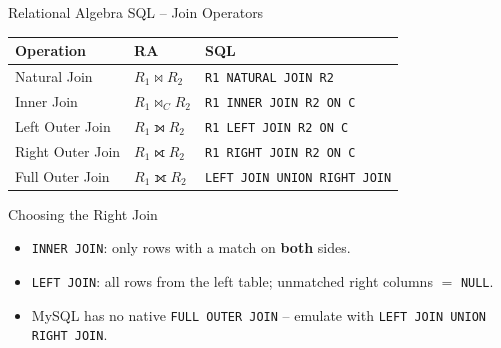 \begin{frame}{Relational Algebra \textrightarrow{} SQL -- Join Operators}
  \begin{center}
  \renewcommand{\arraystretch}{1.3}
  \begin{tabular}{@{}lll@{}}
    \toprule
    \textbf{Operation}   & \textbf{RA}                   & \textbf{SQL} \\
    \midrule
    Natural Join       & $R_1 \bowtie R_2$             & \texttt{R1 NATURAL JOIN R2} \\
    Inner Join         & $R_1 \bowtie_C R_2$           & \texttt{R1 INNER JOIN R2 ON C} \\
    Left Outer Join    & $R_1 \leftouterjoin R_2$      & \texttt{R1 LEFT JOIN R2 ON C} \\
    Right Outer Join   & $R_1 \rightouterjoin R_2$     & \texttt{R1 RIGHT JOIN R2 ON C} \\
    Full Outer Join    & $R_1 \fullouterjoin R_2$      & \texttt{LEFT JOIN UNION RIGHT JOIN} \\
    \bottomrule
  \end{tabular}
  \end{center}

  \begin{block}{Choosing the Right Join}
    \begin{itemize}
      \item \texttt{INNER JOIN}: only rows with a match on \textbf{both} sides.
      \item \texttt{LEFT JOIN}: all rows from the left table; unmatched right columns $=$ \texttt{NULL}.
      \item MySQL has no native \texttt{FULL OUTER JOIN} -- emulate with \texttt{LEFT JOIN UNION RIGHT JOIN}.
    \end{itemize}
  \end{block}
\end{frame}

